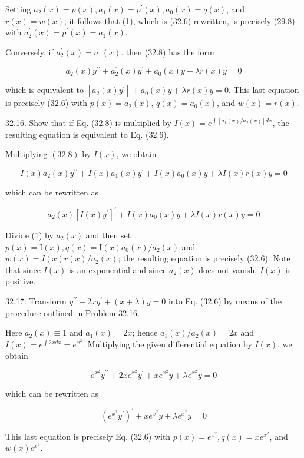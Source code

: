 \documentclass[10pt]{article}
\begin{document}
Setting $a_{2}(x)=p(x), a_{1}(x)=p^{\prime}(x), a_{0}(x)=q(x)$, and $r(x)=w(x)$, it follows that (1), which is (32.6) rewritten, is precisely (29.8) with $a_{2}^{\prime}(x)=p^{\prime}(x)=a_{1}(x)$.

Conversely, if $a_{2}^{\prime}(x)=a_{1}(x)$. then (32.8) has the form

$$
a_{2}(x) y^{\prime \prime}+a_{2}^{\prime}(x) y^{\prime}+a_{0}(x) y+\lambda r(x) y=0
$$

which is equivalent to $\left[a_{2}(x) y^{\prime}\right]+a_{0}(x) y+\lambda r(x) y=0$. This last equation is precisely (32.6) with $p(x)=a_{2}(x)$, $q(x)=a_{0}(x)$, and $w(x)=r(x)$.

32.16. Show that if Eq. (32.8) is multiplied by $I(x)=e^{\int\left[a_{1}(x) / a_{2}(x)\right] d x}$, the resulting equation is equivalent to Eq. (32.6).

Multiplying $(32.8)$ by $I(x)$, we obtain

$$
I(x) a_{2}(x) y^{\prime \prime}+I(x) a_{1}(x) y^{\prime}+I(x) a_{0}(x) y+\lambda I(x) r(x) y=0
$$

which can be rewritten as


\begin{equation*}
a_{2}(x)\left[I(x) y^{\prime}\right]^{\prime}+I(x) a_{0}(x) y+\lambda I(x) r(x) y=0 \tag{1}
\end{equation*}


Divide (1) by $a_{2}(x)$ and then set $p(x)=\mathrm{I}(x), q(x)=\mathrm{I}(x) a_{0}(x) / a_{2}(x)$ and $w(x)=I(x) r(x) / a_{2}(x)$; the resulting equation is precisely (32.6). Note that since $I(x)$ is an exponential and since $a_{2}(x)$ does not vanish, $I(x)$ is positive.

32.17. Transform $y^{\prime \prime}+2 x y^{\prime}+(x+\lambda) y=0$ into Eq. (32.6) by means of the procedure outlined in Problem 32.16.

Here $a_{2}(x) \equiv 1$ and $a_{1}(x)=2 x$; hence $a_{1}(x) / a_{2}(x)=2 x$ and $I(x)=e^{\int 2 x d x}=e^{x^{2}}$. Multiplying the given differential equation by $I(x)$, we obtain

$$
e^{x^{2}} y^{\prime \prime}+2 x e^{x^{2}} y^{\prime}+x e^{x^{2}} y+\lambda e^{x^{2}} y=0
$$

which can be rewritten as

$$
\left(e^{x^{2}} y^{\prime}\right)^{\prime}+x e^{x^{2}} y+\lambda e^{x^{2}} y=0
$$

This last equation is precisely Eq. (32.6) with $p(x)=e^{x^{2}}, q(x)=x e^{x^{2}}$, and $w(x) e^{x^{2}}$.
\end{document}
